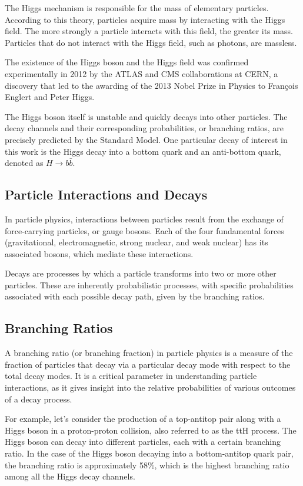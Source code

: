 The Higgs mechanism is responsible for the mass of elementary particles. According to this theory, particles acquire
mass by interacting with the Higgs field. The more strongly a particle interacts with this field, the greater its mass.
Particles that do not interact with the Higgs field, such as photons, are massless.

The existence of the Higgs boson and the Higgs field was confirmed experimentally in 2012 by the ATLAS and CMS
collaborations at CERN, a discovery that led to the awarding of the 2013 Nobel Prize in Physics to François Englert and
Peter Higgs.

The Higgs boson itself is unstable and quickly decays into other particles. The decay channels and their corresponding
probabilities, or branching ratios, are precisely predicted by the Standard Model. One particular decay of interest in
this work is the Higgs decay into a bottom quark and an anti-bottom quark, denoted as $H\rightarrow b\bar{b}$.


\subsection{Particle Interactions and Decays}

In particle physics, interactions between particles result from the exchange of force-carrying particles, or gauge
bosons. Each of the four fundamental forces (gravitational, electromagnetic, strong nuclear, and weak nuclear) has its
associated bosons, which mediate these interactions.

Decays are processes by which a particle transforms into two or more other particles. These are inherently probabilistic
processes, with specific probabilities associated with each possible decay path, given by the branching ratios.


\subsection{Branching Ratios}

A branching ratio (or branching fraction) in particle physics is a measure of the fraction of particles that decay via a
particular decay mode with respect to the total decay modes. It is a critical parameter in understanding particle
interactions, as it gives insight into the relative probabilities of various outcomes of a decay process.

For example, let's consider the production of a top-antitop pair along with a Higgs boson in a proton-proton collision,
also referred to as the ttH process. The Higgs boson can decay into different particles, each with a certain branching
ratio. In the case of the Higgs boson decaying into a bottom-antitop quark pair, the branching ratio is approximately
58\%, which is the highest branching ratio among all the Higgs decay channels.


